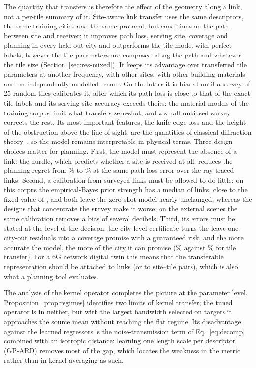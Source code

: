 The quantity that transfers is therefore the effect of the geometry along a
link, not a per-tile summary of it. Site-aware link transfer uses the same
descriptors, the same training cities and the same protocol, but conditions
on the path between site and receiver; it improves path loss, serving site,
coverage and planning in every held-out city and outperforms the tile model
with perfect labels, however the tile parameters are composed along the
path and whatever the tile size (Section~\ref{sec:res-mixed}). It keeps its
advantage over transferred tile parameters at another frequency, with other
sites, with other building materials and on independently modelled scenes.
On the latter it is biased until a survey of 25 random tiles calibrates it,
after which its path loss is close to that of the exact tile labels and its
serving-site accuracy exceeds theirs: the material models of the training
corpus limit what transfers zero-shot, and a small unbiased survey corrects
the rest. Its most important features, the knife-edge loss and the height
of the obstruction above the line of sight, are the quantities of classical
diffraction theory~\cite{itup526}, so the model remains interpretable in
physical terms. Three design choices matter for planning. First, the model
must represent the absence of a link: the hurdle, which predicts whether a
site is received at all, reduces the planning regret from \regretLinkReg\%
to \regretLink\% at the same path-loss error over the ray-traced links.
Second, a calibration from surveyed links must be allowed to do little: on
this corpus the empirical-Bayes prior strength has a median of
\kappaMedianTwentyFive{} links, close to the fixed value of \kappaLink, and
both leave the zero-shot model nearly unchanged, whereas the designs that
concentrate the survey make it worse; on the external scenes the same
calibration removes a bias of several decibels. Third, its errors must be
stated at the level of the decision: the city-level certificate turns the
leave-one-city-out residuals into a coverage promise with a guaranteed
risk, and the more accurate the model, the more of the city it can promise
(\certClaimLink\% against \certClaimGbdt\% for tile transfer). For a 6G
network digital twin this means that the transferable representation should
be attached to links (or to site--tile pairs), which is also what a planning
tool evaluates.

The analysis of the kernel operator completes the picture at the parameter
level. Proposition~\ref{prop:regimes} identifies two limits of kernel
transfer; the tuned operator is in neither, but with the largest bandwidth
selected on \nSigmaLargest{} targets it approaches the source mean without
reaching the flat regime. Its disadvantage against the learned regressors
is the noise-transmission term of Eq.~\eqref{eq:decomp} combined with an
isotropic distance: learning one length scale per descriptor (GP-ARD)
removes most of the gap, which locates the weakness in the metric rather
than in kernel averaging as such.


